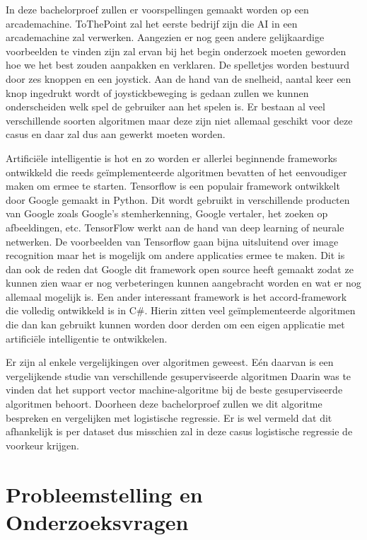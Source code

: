 In deze bachelorproef zullen er voorspellingen gemaakt worden op een arcademachine. ToThePoint zal het eerste bedrijf zijn die AI in een arcademachine zal verwerken. Aangezien er nog geen andere gelijkaardige voorbeelden te vinden zijn zal ervan bij het begin onderzoek moeten geworden hoe we het best zouden aanpakken en verklaren. De spelletjes worden bestuurd door zes knoppen en een joystick. Aan de hand van de snelheid, aantal keer een knop ingedrukt wordt of joystickbeweging is gedaan zullen we kunnen onderscheiden welk spel de gebruiker aan het spelen is. Er bestaan al veel verschillende soorten algoritmen maar deze zijn niet allemaal geschikt voor deze casus en daar zal dus aan gewerkt moeten worden. 

Artificiële intelligentie is hot en zo worden er allerlei beginnende frameworks ontwikkeld die reeds geïmplementeerde algoritmen bevatten of het eenvoudiger maken om ermee te starten. 
Tensorflow is een populair framework ontwikkelt door Google gemaakt in Python. Dit wordt gebruikt in verschillende producten van Google zoals Google's stemherkenning, Google vertaler, het zoeken op afbeeldingen, etc.
TensorFlow werkt aan de hand van deep learning of neurale netwerken. De voorbeelden van Tensorflow gaan bijna uitsluitend over image recognition maar het is mogelijk om andere applicaties ermee te maken. Dit is dan ook de reden dat Google dit framework open source heeft gemaakt zodat ze kunnen zien waar er nog verbeteringen kunnen aangebracht worden en wat er nog allemaal mogelijk is. \autocite{GooglesTensorflow}
Een ander interessant framework is het accord-framework \autocite{accord} die volledig ontwikkeld is in C\#. Hierin zitten veel geïmplementeerde algoritmen die dan kan gebruikt kunnen worden door derden om een eigen applicatie met artificiële intelligentie te ontwikkelen. 

Er zijn al enkele vergelijkingen over algoritmen geweest. Eén daarvan is een vergelijkende studie van verschillende gesuperviseerde algoritmen \autocite{vergelijkingSupervised} Daarin was te vinden dat het support vector machine-algoritme bij de beste gesuperviseerde algoritmen behoort. Doorheen deze bachelorproef zullen we dit algoritme bespreken en vergelijken met logistische regressie. Er is wel vermeld dat dit afhankelijk is per dataset dus misschien zal in deze casus logistische regressie de voorkeur krijgen.

\section{Probleemstelling en Onderzoeksvragen}
\label{sec:onderzoeksvragen}

